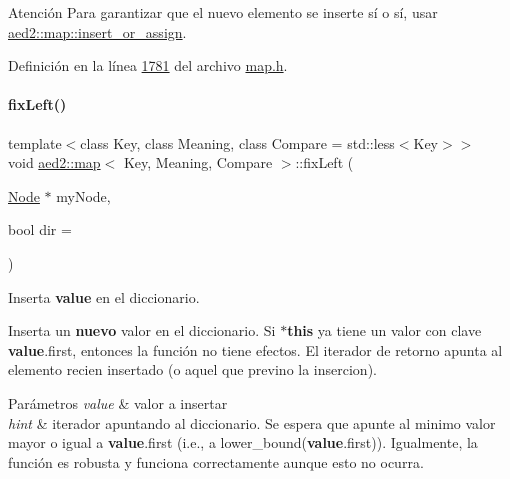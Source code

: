\begin{DoxyAttention}{Atención}
Para garantizar que el nuevo elemento se inserte sí o sí, usar \hyperlink{classaed2_1_1map_a2ef6723c183916276b0afc4a4c721475_a2ef6723c183916276b0afc4a4c721475}{aed2\+::map\+::insert\+\_\+or\+\_\+assign}. 
\end{DoxyAttention}


Definición en la línea \hyperlink{map_8h_source_l01781}{1781} del archivo \hyperlink{map_8h_source}{map.\+h}.

\mbox{\label{classaed2_1_1map_ae69c26a9d27f538124cd827646e56feb_ae69c26a9d27f538124cd827646e56feb}} 
\paragraph{\texorpdfstring{fix\+Left()}{fixLeft()}}
{\footnotesize\ttfamily template$<$class Key, class Meaning, class Compare = std\+::less$<$\+Key$>$$>$ \\
void \hyperlink{classaed2_1_1map}{aed2\+::map}$<$ Key, Meaning, Compare $>$\+::fix\+Left (\begin{DoxyParamCaption}\item[{\hyperlink{structaed2_1_1map_1_1Node}{Node} $\ast$}]{my\+Node,  }\item[{bool}]{dir = {} }\end{DoxyParamCaption})\hspace{0.3cm}{\ttfamily [inline]}}



Inserta {\bfseries value} en el diccionario. 

Inserta un {\bfseries nuevo} valor en el diccionario. Si {\bfseries $\ast$this} ya tiene un valor con clave {\bfseries value}.first, entonces la función no tiene efectos. El iterador de retorno apunta al elemento recien insertado (o aquel que previno la insercion).


\begin{DoxyParams}{Parámetros}
{\em value} & valor a insertar \\
\hline
{\em hint} & iterador apuntando al diccionario. Se espera que apunte al minimo valor mayor o igual a {\bfseries value}.first (i.\+e., a lower\+\_\+bound({\bfseries value}.first)). Igualmente, la función es robusta y funciona correctamente aunque esto no ocurra. \\
\hline
\end{DoxyParams}

